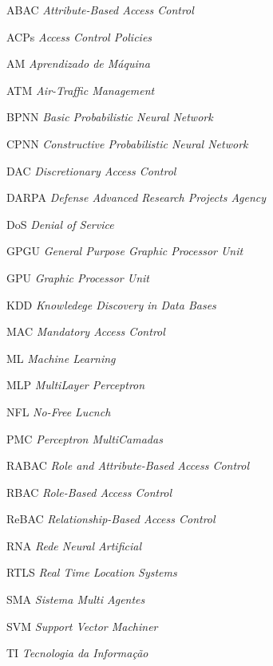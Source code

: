 \documentclass[
	12pt,				%
	openright,			%
	oneside,			%
	a4paper,			%
	english,			%
	french,				%
	spanish,			%
	brazil				%
	]{abntex2}
\begin{document}
\listoftables*

\begin{siglas}
  \item [ABAC] \textit{Attribute-Based Access Control}  
  \item [ACPs] \textit{Access Control Policies}
  \item[AM] \textit{Aprendizado de Máquina}
  \item[ATM] \textit{Air-Traffic Management}
  \item[BPNN] \textit{Basic Probabilistic Neural Network}
  \item[CPNN] \textit{Constructive Probabilistic Neural Network}
  \item[DAC] \textit{Discretionary Access Control}
  \item[DARPA] \textit{Defense Advanced Research Projects Agency}
  \item[DoS] \textit{Denial of Service}
  \item[GPGU] \textit{General Purpose Graphic Processor Unit}
  \item[GPU] \textit{Graphic Processor Unit}
  \item[KDD] \textit{Knowledege Discovery in Data Bases}
  \item[MAC] \textit{Mandatory Access Control}
  \item[ML] \textit{Machine Learning}
  \item[MLP] \textit{MultiLayer Perceptron}
  \item[NFL] \textit{No-Free Lucnch}
  \item[PMC] \textit{Perceptron MultiCamadas}
  \item [RABAC] \textit{Role and Attribute-Based Access Control}
  \item[RBAC] \textit{Role-Based Access Control}
  \item[ReBAC] \textit{Relationship-Based Access Control}
  \item[RNA] \textit{Rede Neural Artificial}
  \item[RTLS] \textit{Real Time Location Systems}
  \item[SMA] \textit{Sistema Multi Agentes}
  \item[SVM] \textit{Support Vector Machiner}
  \item[TI] \textit{Tecnologia da Informação}
\end{siglas}
\end{document}
